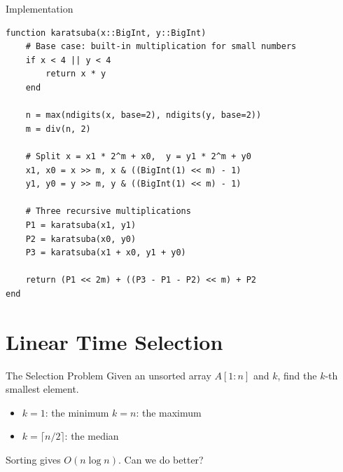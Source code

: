 \documentclass[10pt,aspectratio=169]{beamer}
\begin{document}
\begin{frame}[fragile]{Implementation}
  \begin{lstlisting}
function karatsuba(x::BigInt, y::BigInt)
    # Base case: built-in multiplication for small numbers
    if x < 4 || y < 4
        return x * y
    end

    n = max(ndigits(x, base=2), ndigits(y, base=2))
    m = div(n, 2)

    # Split x = x1 * 2^m + x0,  y = y1 * 2^m + y0
    x1, x0 = x >> m, x & ((BigInt(1) << m) - 1)
    y1, y0 = y >> m, y & ((BigInt(1) << m) - 1)

    # Three recursive multiplications
    P1 = karatsuba(x1, y1)
    P2 = karatsuba(x0, y0)
    P3 = karatsuba(x1 + x0, y1 + y0)

    return (P1 << 2m) + ((P3 - P1 - P2) << m) + P2
end
  \end{lstlisting}
\end{frame}

\section{Linear Time Selection}

\begin{frame}{The Selection Problem}
  Given an \alert{unsorted} array $A[1:n]$ and $k$, find the $k$-th smallest element.

  \bigskip
  \begin{center}
  \end{center}

  \bigskip
  \begin{itemize}
    \item $k = 1$: the minimum \quad $k = n$: the maximum
    \item $k = \lceil n/2 \rceil$: the median
  \end{itemize}

  \bigskip
  \begin{center}
    Sorting gives $O(n \log n)$. Can we do better?
  \end{center}
\end{frame}
\end{document}
